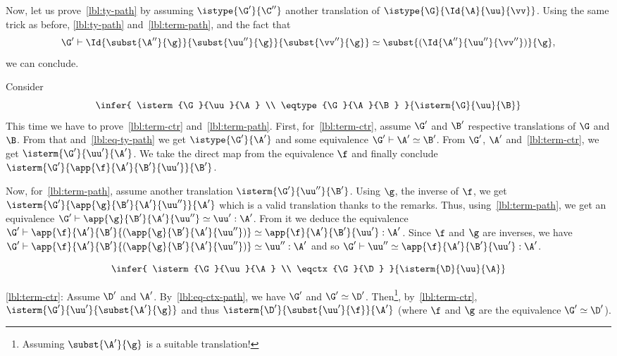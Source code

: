 \sloppy
Now, let us prove~\eqref{lbl:ty-path} by assuming $\istype{\G'}{\C''}$ another
translation of $\istype{\G}{\Id{\A}{\uu}{\vv}}$.
Using the same trick as before, \eqref{lbl:ty-path} and~\eqref{lbl:term-path},
and the  fact that
%
\begin{equation*}
  \G' \vdash \Id{\subst{\A''}{\g}}{\subst{\uu''}{\g}}{\subst{\vv''}{\g}}
  \simeq \subst{(\Id{\A''}{\uu''}{\vv''})}{\g},
\end{equation*}
%
we can conclude.


Consider
%
\begin{equation*}
  \infer{
    \isterm{\G}{\uu}{\A} \\
    \eqtype{\G}{\A}{\B}
  }
  {\isterm{\G}{\uu}{\B}}
\end{equation*}
%
This time we have to prove~\eqref{lbl:term-ctr} and~\eqref{lbl:term-path}.
First, for~\eqref{lbl:term-ctr}, assume $\G'$ and $\B'$ respective translations
of $\G$ and $\B$. From that and~\eqref{lbl:eq-ty-path} we get
$\istype{\G'}{\A'}$ and some equivalence $\G' \vdash \A' \simeq \B'$.
From $\G'$, $\A'$ and~\eqref{lbl:term-ctr}, we get $\isterm{\G'}{\uu'}{\A'}$.
We take the direct map from the equivalence $\f$ and finally
conclude $\isterm{\G'}{\app{\f}{\A'}{\B'}{\uu'}}{\B'}$.

Now, for~\eqref{lbl:term-path}, assume another translation
$\isterm{\G'}{\uu''}{\B'}$.
Using $\g$, the inverse of $\f$, we get
$\isterm{\G'}{\app{\g}{\B'}{\A'}{\uu''}}{\A'}$ which is a valid translation
thanks to the remarks. Thus, using~\eqref{lbl:term-path}, we get an equivalence
$\G' \vdash \app{\g}{\B'}{\A'}{\uu''} \simeq \uu' : \A'$.
From it we deduce the equivalence
$\G' \vdash \app{\f}{\A'}{\B'}{(\app{\g}{\B'}{\A'}{\uu''})}
\simeq \app{\f}{\A'}{\B'}{\uu'} : \A'$.
Since $\f$ and $\g$ are inverses, we have
$\G' \vdash \app{\f}{\A'}{\B'}{(\app{\g}{\B'}{\A'}{\uu''})}
\simeq \uu'' : \A'$ and so
$\G' \vdash \uu'' \simeq \app{\f}{\A'}{\B'}{\uu'} : \A'$.


%
\begin{equation*}
  \infer{
    \isterm{\G}{\uu}{\A} \\
    \eqctx{\G}{\D}
  }
  {\isterm{\D}{\uu}{\A}}
\end{equation*}

\eqref{lbl:term-ctr}: Assume $\D'$ and $\A'$.
By~\eqref{lbl:eq-ctx-path}, we have $\G'$ and $\G' \simeq \D'$.
Then\footnote{Assuming $\subst{\A'}{\g}$ is a suitable translation!},
by~\eqref{lbl:term-ctr}, $\isterm{\G'}{\uu'}{\subst{\A'}{\g}}$ and thus
$\isterm{\D'}{\subst{\uu'}{\f}}{\A'}$ (where $\f$ and $\g$ are the equivalence
$\G' \simeq \D'$). 

